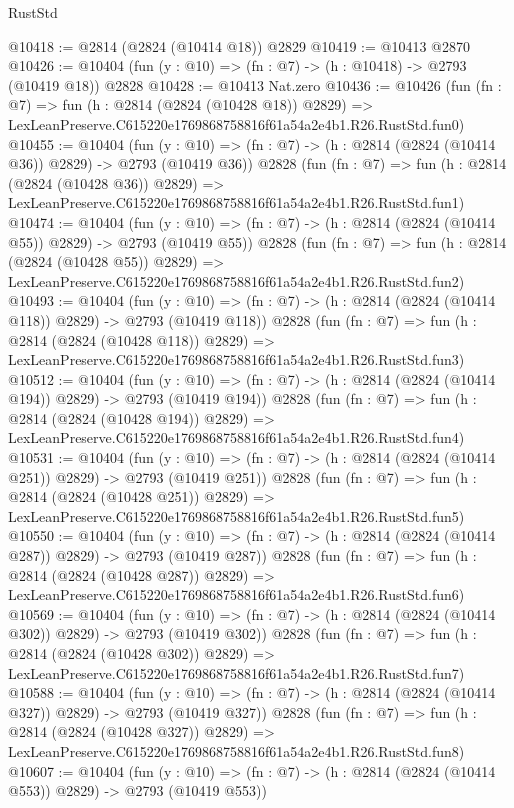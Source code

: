 \begin{lexlean}{RustStd}
\begin{coremodule}
@10418 := @2814 (@2824 (@10414 @18)) @2829
@10419 := @10413 @2870
@10426 := @10404 (fun (y : @10) => (fn : @7) -> (h : @10418) -> @2793 (@10419 @18)) @2828
@10428 := @10413 Nat.zero
@10436 := @10426
    (fun (fn : @7) =>
    fun (h : @2814 (@2824 (@10428 @18)) @2829) =>
    LexLeanPreserve.C615220e1769868758816f61a54a2e4b1.R26.RustStd.fun0)
@10455 := @10404
    (fun (y : @10) => (fn : @7) -> (h : @2814 (@2824 (@10414 @36)) @2829) -> @2793 (@10419 @36))
    @2828
    (fun (fn : @7) =>
    fun (h : @2814 (@2824 (@10428 @36)) @2829) =>
    LexLeanPreserve.C615220e1769868758816f61a54a2e4b1.R26.RustStd.fun1)
@10474 := @10404
    (fun (y : @10) => (fn : @7) -> (h : @2814 (@2824 (@10414 @55)) @2829) -> @2793 (@10419 @55))
    @2828
    (fun (fn : @7) =>
    fun (h : @2814 (@2824 (@10428 @55)) @2829) =>
    LexLeanPreserve.C615220e1769868758816f61a54a2e4b1.R26.RustStd.fun2)
@10493 := @10404
    (fun (y : @10) => (fn : @7) -> (h : @2814 (@2824 (@10414 @118)) @2829) -> @2793 (@10419 @118))
    @2828
    (fun (fn : @7) =>
    fun (h : @2814 (@2824 (@10428 @118)) @2829) =>
    LexLeanPreserve.C615220e1769868758816f61a54a2e4b1.R26.RustStd.fun3)
@10512 := @10404
    (fun (y : @10) => (fn : @7) -> (h : @2814 (@2824 (@10414 @194)) @2829) -> @2793 (@10419 @194))
    @2828
    (fun (fn : @7) =>
    fun (h : @2814 (@2824 (@10428 @194)) @2829) =>
    LexLeanPreserve.C615220e1769868758816f61a54a2e4b1.R26.RustStd.fun4)
@10531 := @10404
    (fun (y : @10) => (fn : @7) -> (h : @2814 (@2824 (@10414 @251)) @2829) -> @2793 (@10419 @251))
    @2828
    (fun (fn : @7) =>
    fun (h : @2814 (@2824 (@10428 @251)) @2829) =>
    LexLeanPreserve.C615220e1769868758816f61a54a2e4b1.R26.RustStd.fun5)
@10550 := @10404
    (fun (y : @10) => (fn : @7) -> (h : @2814 (@2824 (@10414 @287)) @2829) -> @2793 (@10419 @287))
    @2828
    (fun (fn : @7) =>
    fun (h : @2814 (@2824 (@10428 @287)) @2829) =>
    LexLeanPreserve.C615220e1769868758816f61a54a2e4b1.R26.RustStd.fun6)
@10569 := @10404
    (fun (y : @10) => (fn : @7) -> (h : @2814 (@2824 (@10414 @302)) @2829) -> @2793 (@10419 @302))
    @2828
    (fun (fn : @7) =>
    fun (h : @2814 (@2824 (@10428 @302)) @2829) =>
    LexLeanPreserve.C615220e1769868758816f61a54a2e4b1.R26.RustStd.fun7)
@10588 := @10404
    (fun (y : @10) => (fn : @7) -> (h : @2814 (@2824 (@10414 @327)) @2829) -> @2793 (@10419 @327))
    @2828
    (fun (fn : @7) =>
    fun (h : @2814 (@2824 (@10428 @327)) @2829) =>
    LexLeanPreserve.C615220e1769868758816f61a54a2e4b1.R26.RustStd.fun8)
@10607 := @10404
    (fun (y : @10) => (fn : @7) -> (h : @2814 (@2824 (@10414 @553)) @2829) -> @2793 (@10419 @553))

\end{coremodule}
\end{lexlean}
